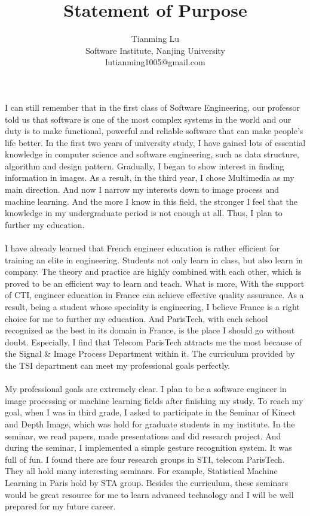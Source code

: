 \documentclass[a4paper]{article}
\title{Statement of Purpose}
\author{Tianming Lu \\
		Software Institute, Nanjing University\\
		lutianming1005@gmail.com}
\date{}
\begin{document}
\maketitle
\paragraph{}
I can still remember that in the first class of Software Engineering, our professor told us that software is one of the most complex systems in the world and our duty is to make functional, powerful and reliable software that can make people's life better. In the first two years of university study, I have gained lots of essential knowledge in computer science and software engineering, such as data structure, algorithm and design pattern. Gradually, I began to show interest in finding information in images. As a result, in the third year, I chose Multimedia as my main direction. And now I narrow my interests down to image process and machine learning.
And the more I know in this field, the stronger I feel that the knowledge in my undergraduate period is not enough at all. Thus, I plan to further my education. 
\paragraph{}
I have already learned that French engineer education is rather efficient for training an elite in engineering. Students not only learn in class, but also learn in company. The theory and practice are highly combined with each other, which is proved to be an efficient way to learn and teach. What is more, With the support of CTI, engineer education in France can achieve effective quality assurance. As a result, being a student whose speciality is engineering, I believe France is a right choice for me to further my education. And ParisTech, with each school recognized as the best in its domain in France, is the place I should go without doubt. Especially, I find that Telecom ParisTech attracts me the most because of the Signal \& Image Process Department within it. The curriculum provided by the TSI department can meet my professional goals perfectly.
\paragraph{}
My professional goals are extremely clear. I plan to be a software engineer in image processing or machine learning fields after finishing my study. To reach my goal, when I was in third grade, I asked to participate in the Seminar of Kinect and Depth Image, which was hold for graduate students in my institute. In the seminar, we read papers, made presentations and did research project. And during the seminar, I implemented a simple gesture recognition system. It was full of fun. I found there are four research groups in STI, telecom ParisTech. They all hold many interesting seminars. For example, Statistical Machine Learning in Paris hold by STA group. Besides the curriculum, these seminars would be great resource for me to learn advanced technology and I will be well prepared for my future career. 
\end{document}
